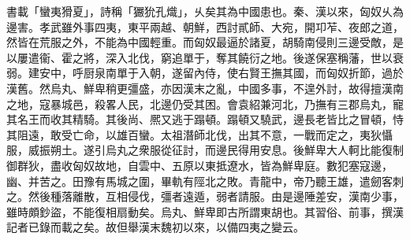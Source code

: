 \begin{pinyinscope}
 
 
 書載「蠻夷猾夏」，詩稱「玁狁孔熾」，乆矣其為中國患也。秦、漢以來，匈奴乆為邊害。孝武雖外事四夷，東平兩越、朝鮮，西討貳師、大宛，開卭苲、夜郎之道，然皆在荒服之外，不能為中國輕重。而匈奴最逼於諸夏，胡騎南侵則三邊受敵，是以屢遣衞、霍之將，深入北伐，窮追單于，奪其饒衍之地。後遂保塞稱藩，世以衰弱。建安中，呼厨泉南單于入朝，遂留內侍，使右賢王撫其國，而匈奴折節，過於漢舊。然烏丸、鮮卑稍更彊盛，亦因漢末之亂，中國多事，不遑外討，故得擅漢南之地，寇暴城邑，殺畧人民，北邊仍受其困。會袁紹兼河北，乃撫有三郡烏丸，寵其名王而收其精騎。其後尚、熈又逃于蹋頓。蹋頓又驍武，邊長老皆比之冒頓，恃其阻遠，敢受亡命，以雄百蠻。太祖潛師北伐，出其不意，一戰而定之，夷狄懾服，威振朔土。遂引烏丸之衆服從征討，而邊民得用安息。後鮮卑大人軻比能復制御群狄，盡收匈奴故地，自雲中、五原以東抵遼水，皆為鮮卑庭。數犯塞寇邊，幽、并苦之。田豫有馬城之圍，畢軌有陘北之敗。青龍中，帝乃聽王雄，遣劒客刺之。然後種落離散，互相侵伐，彊者遠遁，弱者請服。由是邊陲差安，漢南少事，雖時頗鈔盜，不能復相扇動矣。烏丸、鮮卑即古所謂東胡也。其習俗、前事，撰漢記者已錄而載之矣。故但舉漢末魏初以來，以備四夷之變云。
 

\end{pinyinscope}
